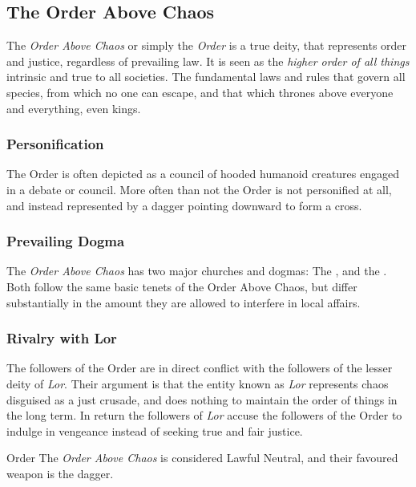 \subsection{The Order Above Chaos}
\label{sec:Order}

The \emph{Order Above Chaos} or simply the \emph{Order} is a true deity, that
represents order and justice, regardless of prevailing law. It is seen as the
\emph{higher order of all things} intrinsic and true to all societies. The
fundamental laws and rules that govern all species, from which no one can
escape, and that which thrones above everyone and everything, even kings.

\subsubsection{Personification}

The Order is often depicted as a council of hooded humanoid creatures engaged
in a debate or council. More often than not the Order is not personified at
all, and instead represented by a dagger pointing downward to form a cross.

\subsubsection{Prevailing Dogma}

The \emph{Order Above Chaos} has two major churches and dogmas: The
, and the .
Both follow the same basic tenets of the Order Above Chaos, but differ
substantially in the amount they are allowed to interfere in local affairs.

\subsubsection{Rivalry with Lor}

The followers of the Order are in direct conflict with the followers of the
lesser deity of \emph{Lor}. Their argument is that the entity known as
\emph{Lor} represents chaos disguised as a just crusade, and does nothing to
maintain the order of things in the long term. In return the followers of
\emph{Lor} accuse the followers of the Order to indulge in vengeance instead
of seeking true and fair justice.

\begin{35e}{Order}
  The \emph{Order Above Chaos} is considered Lawful Neutral, and their favoured
  weapon is the dagger.
\end{35e}
